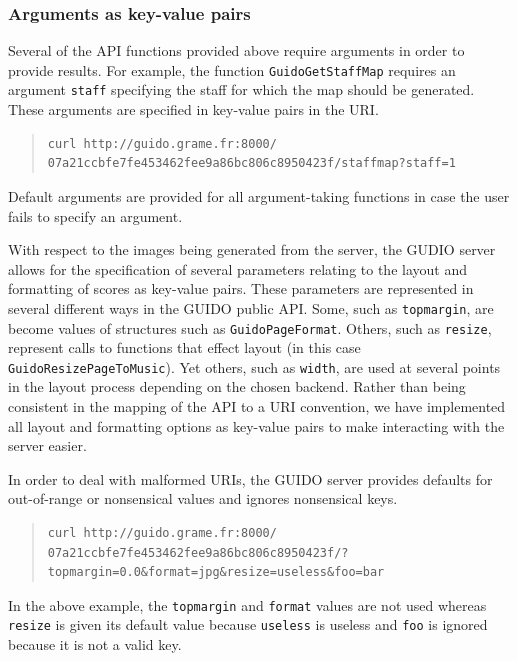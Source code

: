 \documentclass{article}
\newcommand{\guidosize}{6pt}
\begin{document}
\subsubsection{Arguments as key-value pairs}
Several of the API functions provided above require arguments in order to provide results.  For example, the function \verb=GuidoGetStaffMap= requires an argument \verb=staff= specifying the staff for which the map should be generated.  These arguments are specified in key-value pairs in the URI.
\begin{quote}
\begingroup
\fontsize{\guidosize}{12pt}\selectfont
\begin{verbatim}
curl http://guido.grame.fr:8000/
07a21ccbfe7fe453462fee9a86bc806c8950423f/staffmap?staff=1
\end{verbatim}
\endgroup
\end{quote}
Default arguments are provided for all argument-taking functions in case the user fails to specify an argument.\par
With respect to the images being generated from the server, the GUDIO server allows for the specification of several parameters relating to the layout and formatting of scores as key-value pairs.  These parameters are represented in several different ways in the GUIDO public API.  Some, such as \verb=topmargin=, are become values of structures such as \verb=GuidoPageFormat=.  Others, such as \verb=resize=, represent calls to functions that effect layout (in this case \verb=GuidoResizePageToMusic=).  Yet others, such as \verb=width=, are used at several points in the layout process depending on the chosen backend.  Rather than being consistent in the mapping of the API to a URI convention, we have implemented all layout and formatting options as key-value pairs to make interacting with the server easier.\par
In order to deal with malformed URIs, the GUIDO server provides defaults for out-of-range or nonsensical values and ignores nonsensical keys.
\begin{quote}
\begingroup
\fontsize{\guidosize}{12pt}\selectfont
\begin{verbatim}
curl http://guido.grame.fr:8000/
07a21ccbfe7fe453462fee9a86bc806c8950423f/?
topmargin=0.0&format=jpg&resize=useless&foo=bar
\end{verbatim}
\endgroup
\end{quote}
In the above example, the \verb=topmargin= and \verb=format= values are not used whereas \verb=resize= is given its default value because \verb=useless= is  useless and \verb=foo= is ignored because it is not a valid key.%
\end{document}
